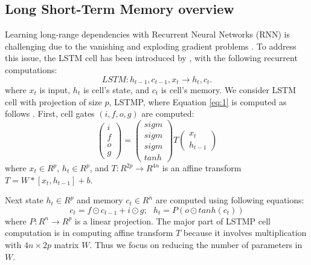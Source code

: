 \documentclass{article} \usepackage{iclr2017_workshop,times}
\begin{document}
\subsection{Long Short-Term Memory overview}
Learning long-range dependencies with Recurrent Neural Networks (RNN) is challenging due to the vanishing and exploding gradient problems \citep{bengio1994learning, pascanu2013difficulty}. To address this issue, the  LSTM cell has been introduced by  \citet{hochreiter1997long}, with the following recurrent computations:  
\begin{equation}\label{eq:1}
LSTM:  h_{t-1}, c_{t-1}, x_{t}  \rightarrow h_t, c_t.
\end{equation}
where $x_t$ is input, $h_t$ is cell's state, and $c_t$ is cell's memory. We consider LSTM cell with projection of size $p$, LSTMP, where Equation \ref{eq:1} is computed as follows \citep{sak2014long, zaremba2014recurrent}.
 First, cell gates $(i,f,o,g)$ are computed:
\begin{equation} \label{eq:2}
\begin{pmatrix} i \\ f \\ o \\ g  \end{pmatrix} = \begin{pmatrix} sigm \\ sigm \\ sigm \\ tanh  \end{pmatrix} T \begin{pmatrix} x_t \\ h_{t-1} \end{pmatrix} 
\end{equation}
where $x_t \in R^p$, $h_t \in R^p$, and $T:R^{2p} \rightarrow R^{4n}$ is an affine transform $T=W*[x_{t}, h_{t-1}] + b$. 

Next state $h_t \in R^p$ and memory $c_t \in R^n$ are computed using following equations:
$$
c_t = f\odot c_{t-1} + i\odot g ; \ \ \ 
h_t = P (o\odot tanh(c_t))
$$
where $P: R^n \rightarrow R^p$ is a linear projection. The major part of LSTMP cell computation is in computing affine transform $T$ because it involves multiplication with $4n\times 2p$ matrix $W$. Thus we focus on reducing the number of parameters in $W$.
\end{document}
